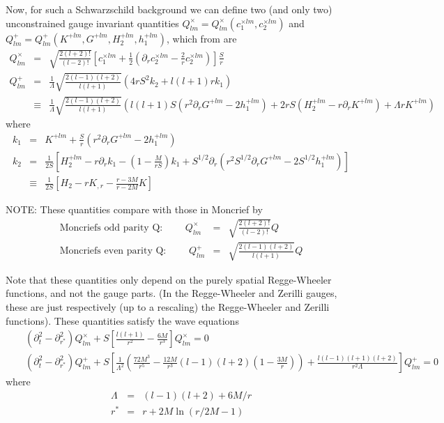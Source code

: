 \documentclass{article}
\begin{document}
Now, for such a Schwarzschild background we can define two (and only two)
unconstrained gauge invariant quantities 
  $Q^{\times}_{lm}=Q^{\times}_{lm}(c_1^{\times lm},c_2^{\times lm})$ 
and
  $Q^{+}_{lm}=Q^{+}_{lm}(K^{+ lm},G^{+ lm},H_2^{+lm},h_1^{+lm})$, 
which from
\cite{abrahams96a} are
\begin{eqnarray}
Q^{\times}_{lm} 
  & = & \sqrt{\frac{2(l+2)!}{(l-2)!}}\left[c_1^{\times lm}
        + \frac{1}{2}\left(\partial_r c_2^{\times lm} - \frac{2}{r}
        c_2^{\times lm}\right)\right] \frac{S}{r}
\\
Q^{+}_{lm}
  & = & \frac{1}{\Lambda}\sqrt{\frac{2(l-1)(l+2)}{l(l+1)}}
        (4rS^2 k_2+l(l+1)r k_1) 
\\
  & \equiv &
        \frac{1}{\Lambda}\sqrt{\frac{2(l-1)(l+2)}{l(l+1)}}
        \left(l(l+1)S(r^2\partial_r G^{+lm}-2h_1^{+lm})+
        2rS(H_2^{+lm}-r\partial_r K^{+lm})+\Lambda r K^{+lm}\right)
\end{eqnarray}
where
\begin{eqnarray}
k_1 & = & K^{+lm} + \frac{S}{r}(r^2\partial_r G^{+lm} - 2h^{+lm}_1) \\
k_2 & = & \frac{1}{2S}
          \left[H^{+lm}_2-r\partial_r k_1-\left(1-\frac{M}{rS}\right) 
            k_1 + S^{1/2}\partial_r
          (r^2 S^{1/2} \partial_r G^{+lm}-2S^{1/2}h_1^{+lm})\right]
\\
&\equiv& \frac{1}{2S}\left[H_2-rK_{,r}-\frac{r-3M}{r-2M}K\right]
\end{eqnarray}

\noindent
NOTE: These quantities compare with those in Moncrief \cite{moncrief74} by
\begin{eqnarray*}
\mbox{Moncriefs odd parity Q: }\qquad Q^\times_{lm} &=&
 \sqrt{\frac{2(l+2)!}{(l-2)!}}Q
 \\
\mbox{Moncriefs even parity Q: } \qquad Q^+_{lm} &=&
 \sqrt{\frac{2(l-1)(l+2)}{l(l+1)}}Q
\end{eqnarray*}

Note that these quantities only depend on the purely spatial 
Regge-Wheeler functions, and not the gauge parts. (In the Regge-Wheeler 
and Zerilli gauges, these are just respectively (up to a rescaling)
 the Regge-Wheeler 
and Zerilli functions).
These quantities satisfy the wave equations
\begin{eqnarray*}
  &&(\partial^2_t-\partial^2_{r^*})Q^\times_{lm}+S\left[\frac{l(l+1)}{r^2}-\frac{6M}{r^3}
  \right]Q^{\times}_{lm}  =  0 
  \\
  &&(\partial^2_t-\partial^2_{r^*})Q^+_{lm}+S\left[
    \frac{1}{\Lambda^2}\left(\frac{72M^3}{r^5}-\frac{12M}{r^3}(l-1)(l+2)\left(1-\frac{3M}{r}\right)
    \right)+\frac{l(l-1)(l+1)(l+2)}{r^2\Lambda}\right]Q^+_{lm}=0
\end{eqnarray*}
where
\begin{eqnarray*}
  \Lambda &=& (l-1)(l+2)+6M/r \\
  r^*     &=& r+2M\ln(r/2M-1)
\end{eqnarray*}
 
\end{document}
